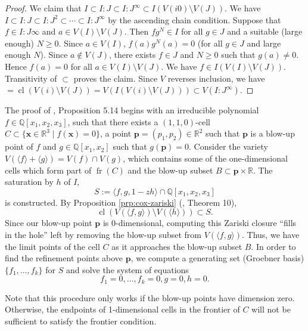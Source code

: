 \documentclass[
]{book}
\theoremstyle{definition}
\theoremstyle{definition}
\theoremstyle{definition}
\theoremstyle{definition}
\theoremstyle{remark}
\begin{document}
\begin{proof}
We claim that \(I \subset I:J \subset I:J^\infty \subset I(V(i0) \setminus V(J))\). We have \(I \subset I:J \subset I:J^2 \subset \cdots \subset I:J^\infty\) by the ascending chain condition.
Suppose that \(f \in I:J\infty\) and \(a \in V(I) \setminus V(J)\). Then \(fg^N \in I\) for all \(g \in J\) and a suitable (large enough) \(N\ge 0\). Since \(a \in V(I)\), \(f(a)g^N(a) = 0\) (for all \(g\in J\) and large enough \(N\)). Since \(a \not \in V(J)\), there exists \(f \in J\) and \(N \ge 0\) such that \(g(a) \ne 0\). Hence \(f(a) = 0\) for all \(a \in V(I) \setminus V(J)\). We have \(f \in I(V(I) \setminus V(J))\). Transitivity of \(\subset\) proves the claim. Since \(V\) reverses inclusion, we have \(= {\operatorname{cl} \left(  V(i) \setminus V(J)  \right)} = V(I(V(i) \setminus V(J))) \subset V(I:J^\infty)\).
\end{proof}

The proof of \citet{lazard10}, Proposition 5.14 begins with an irreducible polynomial \(f \in \mathbb{Q}[x_1,x_2,x_3]\), such that there exists a \((1,1,0)\)-cell \(C \subset \{ \mathbf{x} \in \mathbb{R}^3 \mid f(\mathbf{x}) = 0 \}\), a point \(\mathbf{p} = (p_1,p_2) \in \mathbb{R}^2\) such that \(\mathbf{p}\) is a blow-up point of \(f\) and \(g \in \mathbb{Q}[x_1,x_2]\) such that \(g(\mathbf{p}) = 0\).
Consider the variety \(V(\langle f \rangle + \langle g \rangle ) = V(f) \cap V(g)\), which contains some of the one-dimensional cells which form part of \({\operatorname{fr} \left( C \right)}\) and the blow-up subset \(B \subset \mathbf{p} \times \mathbb{R}\).
The saturation by \(h\) of \(I\),
\[
S := \langle f, g, 1 - zh \rangle \cap \mathbb{Q}[x_1,x_2,x_3]
\]
is constructed.
By Proposition \ref{prp:cox-zariski} (\citet{cox2013}, Theorem 10),
\[
{\operatorname{cl} \left(  V(\langle f,g \rangle) \setminus V(\langle h \rangle)  \right)} \subset S.
\]
Since our blow-up point \(\mathbf{p}\) is \(0\)-dimensional, computing this Zariski closure ``fills in the hole'' left by removing the blow-up subset from \(V(\langle f,g \rangle)\). Thus, we have the limit points of the cell \(C\) as it approaches the blow-up subset \(B\).
In order to find the refinement points above \(\mathbf{p}\), we compute a generating set (Groebner basis) \(\{ f_1,\ldots,f_k \}\) for \(S\) and solve the system of equations
\[
f_1 = 0, \ldots, f_k = 0, g = 0, h = 0.
\]

Note that this procedure only works if the blow-up points have dimension zero. Otherwise, the endpoints of 1-dimensional cells in the frontier of \(C\) will not be sufficient to satisfy the frontier condition.
\end{document}
